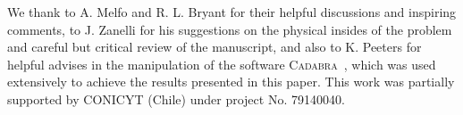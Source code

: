 \documentclass[aps,prl,twocolumn,superscriptaddress,showpacs,showkeys]{revtex4-1}
\begin{document}
\begin{acknowledgments}
  We thank to A. Melfo and R. L. Bryant for their helpful discussions and inspiring comments, to J. Zanelli for his suggestions on the physical insides of the problem and careful but critical review of the manuscript, and also to K. Peeters for helpful advises in the manipulation of the software \textsc{Cadabra}~\cite{Peeters:2007wn,*peeters2007symbolic,*Peeters2007550}, which was used extensively to achieve the results presented in this paper.
  This work was partially supported by CONICYT (Chile) under project No. 79140040.
\end{acknowledgments}



\end{document}
